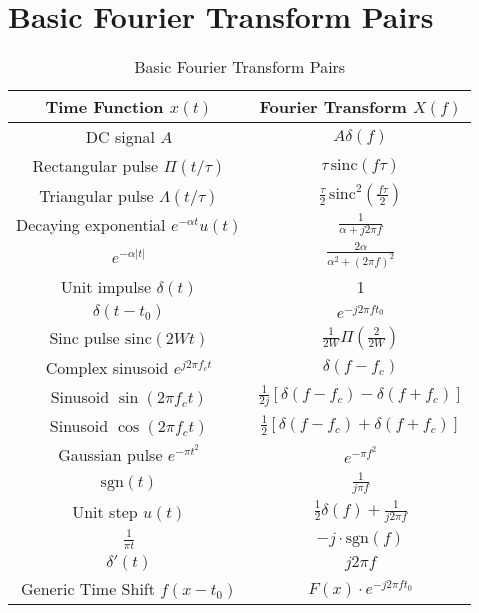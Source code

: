 \documentclass[10pt]{article}
\begin{document}
\newpage
\appendix
\section{Basic Fourier Transform Pairs}
\begin{table}[h!]
    \centering
    \renewcommand{\arraystretch}{1.5}
    \begin{tabular}{c|c}
        \hline
        \textbf{Time Function \( x(t) \)} & \textbf{Fourier Transform \( X(f) \)} \\
        \hline
        DC signal \( A \) & \( A \delta(f) \) \\
        \hline
        Rectangular pulse \( \Pi(t/\tau) \) & \( \tau \, \text{sinc}(f \tau) \) \\
        \hline
        Triangular pulse \( \Lambda(t/\tau) \) & \( \frac{\tau}{2} \, \text{sinc}^2\left(\frac{f \tau}{2}\right) \) \\
        \hline
        Decaying exponential \( e^{-\alpha t} u(t) \) & \( \frac{1}{\alpha + j2\pi f} \) \\
        \hline
        \( e^{-\alpha |t|} \) & \( \frac{2\alpha}{\alpha^2 + (2\pi f)^2} \) \\
        \hline
        Unit impulse \( \delta(t) \) & 1 \\
        \hline
        \( \delta(t - t_0) \) & \( e^{-j2\pi f t_0} \) \\
        \hline
        Sinc pulse \( \text{sinc}(2Wt) \) & \( \frac{1}{2W} \Pi\left(\frac{2}{2W}\right) \) \\
        \hline
        Complex sinusoid \( e^{j2\pi f_c t} \) & \( \delta(f - f_c) \) \\
        \hline
        Sinusoid \( \sin(2\pi f_c t) \) & \( \frac{1}{2j} [\delta(f - f_c) - \delta(f + f_c)] \) \\
        \hline
        Sinusoid \( \cos(2\pi f_c t) \) & \( \frac{1}{2} [\delta(f - f_c) + \delta(f + f_c)] \) \\
        \hline
        Gaussian pulse \( e^{-\pi t^2} \) & \( e^{-\pi f^2} \) \\
        \hline
        \( \text{sgn}(t) \) & \( \frac{1}{j \pi f} \) \\
        \hline
        Unit step \( u(t) \) & \( \frac{1}{2} \delta(f) + \frac{1}{j2\pi f} \) \\
        \hline
        \( \frac{1}{\pi t} \) & \( -j\cdot\text{sgn}(f) \) \\
        \hline
        \( \delta'(t) \) & \( j2\pi f \) \\
        \hline
        Generic Time Shift $f(x-t_0)$ & $F(x)\cdot e^{-j 2 \pi f t_0}$ \\ 
        \hline
    \end{tabular}
    \caption{Basic Fourier Transform Pairs}
\end{table}
\end{document}

